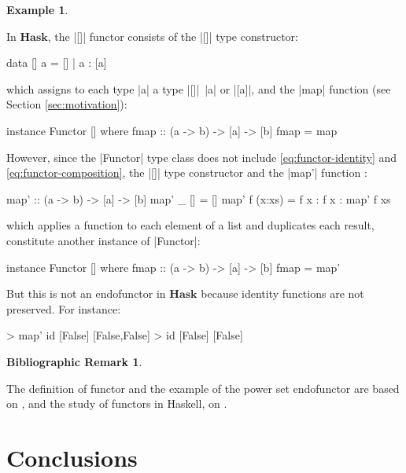 \documentclass[11pt,letterpaper]{article}
\theoremstyle{definition}
\newtheorem{bibremark}{Bibliographic Remark}[section]
\newtheorem{example}{Example}[section]
\newcommand{\catbf}[1]{\ensuremath{\mathbf{#1}}\xspace}
\newcommand{\hask}{\catbf{Hask}}
\begin{document}
\begin{example}
  \label{ex:functor-list}


  In \hask, the |[]| functor consists of the |[]| type constructor:
  \begin{code}
data [] a = [] | a : [a]
  \end{code}
  which assigns to each type |a| a type |[]|~|a| or |[a]|, and the
  |map| function (see Section \ref{sec:motivation}):
  \begin{code}
instance Functor [] where
  fmap :: (a -> b) -> [a] -> [b]
  fmap = map
  \end{code}

  However, since the |Functor| type class does not include
  \eqref{eq:functor-identity} and \eqref{eq:functor-composition}, the
  |[]| type constructor and the |map'| function
  \parencite[22]{yorgey-2009}:
  \begin{code}
map' :: (a -> b) -> [a] -> [b]
map' _ []     = []
map' f (x:xs) = f x : f x : map' f xs
  \end{code}
  which applies a function to each element of a list and duplicates
  each result, constitute another instance of |Functor|:
  \begin{code}
instance Functor [] where
  fmap :: (a -> b) -> [a] -> [b]
  fmap = map'
  \end{code}
  But this is not an endofunctor in \hask because identity functions
  are not preserved. For instance:
  \begin{code}
> map' id [False]
[False,False]
> id [False]
[False]
  \end{code}

\end{example}

\begin{bibremark}
  \label{re:functors}

  The definition of functor and the example of the power set
  endofunctor are based on
  \parencites[13]{maclane-1998}[10--11]{marquis-2013}[428,
    431]{poigne-1992}, and the study of functors in Haskell, on
  \parencites[146--150, 218--227]{lipovaca-2011}[18--23]{yorgey-2009}.

\end{bibremark}


\section{Conclusions}
\label{sec:conclusions}
\end{document}
